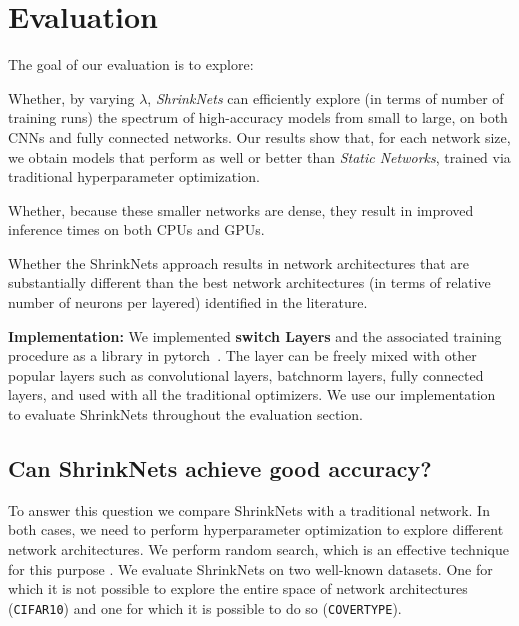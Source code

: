 \section{Evaluation}

The goal of our evaluation is to explore:

\begin{compactitem}

\item Whether, by varying $\lambda$, \textit{ShrinkNets} can efficiently
explore (in terms of number of training runs)  the spectrum of high-accuracy
models from small to large, on both CNNs and fully connected networks.  Our
results show that, for each network size, we obtain models that perform as well
or better than \textit{Static Networks}, trained via traditional hyperparameter
optimization.

\item Whether, because these  smaller networks are dense, they result in
improved inference times on both CPUs and GPUs.

\item Whether the ShrinkNets approach results in network architectures that are
substantially different than the best network architectures (in terms of
relative number of neurons per layered) identified in the literature.

\item {}

\end{compactitem}

\noindent\textbf{Implementation: }We implemented \textbf{switch Layers} and
the associated training procedure as a library in
pytorch~\cite{paszke2017automatic}. The layer can be freely mixed with other
popular layers such as convolutional layers, batchnorm layers, fully connected
layers, and used with all the traditional optimizers. We use our implementation
to evaluate ShrinkNets throughout the evaluation section.

\subsection{Can ShrinkNets achieve good accuracy?}

To answer this question we compare ShrinkNets with a traditional network. In
both cases, we need to perform hyperparameter optimization to explore different
network architectures. We perform random search, which is an effective technique
for this purpose \cite{}. We evaluate ShrinkNets on two well-known datasets. One
for which it is not possible to explore the entire space of network
architectures (\texttt{CIFAR10}) and one for which it is possible to do so
(\texttt{COVERTYPE}).

